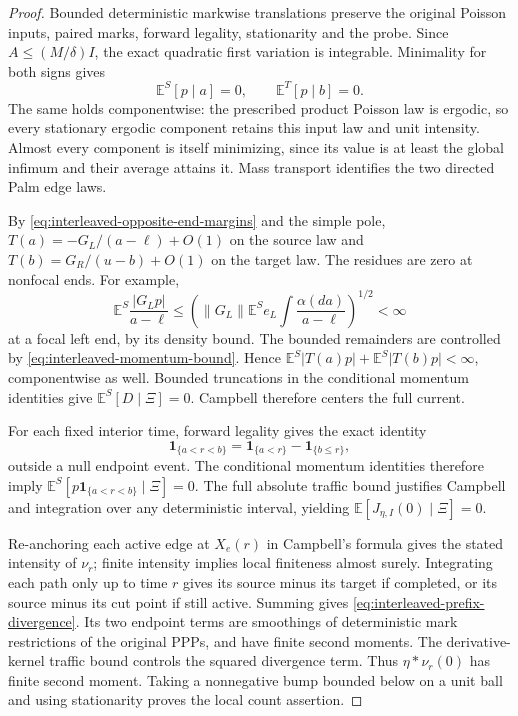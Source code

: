 \documentclass[11pt,reqno]{amsart}
\theoremstyle{definition}
\theoremstyle{remark}
\numberwithin{equation}{section}
\newcommand{\E}{\mathbb E}
\begin{document}
\begin{proof}
Bounded deterministic markwise translations preserve the original
Poisson inputs, paired marks, forward legality, stationarity and the
probe. Since \(A\le(M/\delta)I\), the exact quadratic first
variation is integrable. Minimality for both signs gives
\[
 \E^S[p\mid a]=0,\qquad \E^T[p\mid b]=0.
\]
The same holds componentwise: the prescribed product Poisson law is
ergodic, so every stationary ergodic component retains this input
law and unit intensity. Almost every component is itself minimizing,
since its value is at least the global infimum and their average
attains it. Mass transport identifies the two directed Palm edge laws.

By \eqref{eq:interleaved-opposite-end-margins} and the simple pole,
\(T(a)=-G_L/(a-\ell)+O(1)\) on the source law and
\(T(b)=G_R/(u-b)+O(1)\) on the target law. The residues are zero
at nonfocal ends. For example,
\[
 \E^S\frac{|G_Lp|}{a-\ell}
 \le\left(\|G_L\|\E^S e_L
                   \int\frac{\alpha(da)}{a-\ell}\right)^{1/2}
 <\infty
\]
at a focal left end, by its density bound. The bounded remainders
are controlled by \eqref{eq:interleaved-momentum-bound}. Hence
\(\E^S|T(a)p|+\E^S|T(b)p|<\infty\), componentwise as well.
Bounded truncations in the conditional momentum identities give
\(\E^S[D\mid\Xi]=0\). Campbell therefore centers the full current.

For each fixed interior time, forward legality gives the exact identity
\[
 \mathbf1_{\{a<r<b\}}=
       \mathbf1_{\{a<r\}}-\mathbf1_{\{b\le r\}},
\]
outside a null endpoint event. The conditional momentum identities
therefore imply \(\E^S[p\mathbf1_{\{a<r<b\}}\mid\Xi]=0\).
The full absolute traffic bound justifies Campbell and integration
over any deterministic interval, yielding
\(\E[J_{\eta,I}(0)\mid\Xi]=0\).

Re-anchoring each active edge at \(X_e(r)\) in Campbell's formula
gives the stated intensity of \(\nu_r\); finite intensity implies
local finiteness almost surely. Integrating each path only up to time
\(r\) gives its source minus its target if completed, or its source
minus its cut point if still active. Summing gives
\eqref{eq:interleaved-prefix-divergence}. Its two endpoint terms are
smoothings of deterministic mark restrictions of the original PPPs,
and have finite second moments. The derivative-kernel traffic bound
controls the squared divergence term. Thus \(\eta*\nu_r(0)\) has
finite second moment. Taking a nonnegative bump bounded below on a
unit ball and using stationarity proves the local count assertion.
\end{proof}
\end{document}
